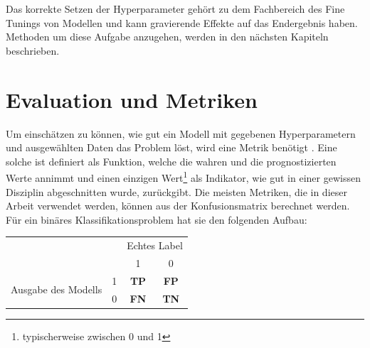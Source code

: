 Das korrekte Setzen der Hyperparameter gehört zu dem Fachbereich des Fine Tunings von Modellen und kann
 gravierende Effekte auf das Endergebnis haben. Methoden um diese Aufgabe anzugehen, werden in den
 nächsten Kapiteln beschrieben.


\section{Evaluation und Metriken}

Um einschätzen zu können, wie gut ein Modell mit gegebenen Hyperparametern und ausgewählten Daten das Problem
 löst, wird eine Metrik benötigt \cite{mlMetrics}. Eine solche ist definiert als Funktion, welche die wahren und die
 prognostizierten Werte annimmt und einen einzigen Wert\footnote{typischerweise zwischen 0 und 1} als
 Indikator, wie gut in einer gewissen Disziplin abgeschnitten wurde, zurückgibt. Die meisten Metriken,
 die in dieser Arbeit verwendet werden, können aus der Konfusionsmatrix berechnet werden. Für ein binäres
 Klassifikationsproblem hat sie den folgenden Aufbau:

\renewcommand{\arraystretch}{1.5}
\begin{table}[h]
    \centering
    \begin{tabular}{c c c c}
        & & \multicolumn{2}{c}{Echtes Label} \\
        \cline{3-4}
        & & 1 & 0 \\
        \hline
        \multirow{2}{10em}{Ausgabe des Modells} & 1 & \textbf{TP} & \textbf{FP} \\
        \cline{2-4}
        & 0 & \textbf{FN} & \textbf{TN} \\
        \hline
    \end{tabular}
\end{table}


